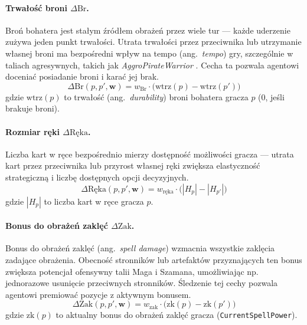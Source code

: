 \paragraph{Trwałość broni $\Delta \text{Br}$.}

Broń bohatera jest stałym źródłem obrażeń przez wiele tur --- każde uderzenie zużywa jeden punkt trwałości. Utrata trwałości przez przeciwnika lub utrzymanie własnej broni ma bezpośredni wpływ na tempo (ang.~\textit{tempo}) gry, szczególnie w taliach agresywnych, takich jak \textit{AggroPirateWarrior} \cite{sanchez2020}. Cecha ta pozwala agentowi doceniać posiadanie broni i karać jej brak.
\begin{equation}
    \Delta \text{Br}(p, p', \mathbf{w}) =
        w_{\text{Br}} \cdot \bigl(\text{wtrz}(p) - \text{wtrz}(p')\bigr)
\end{equation}
gdzie $\text{wtrz}(p)$ to trwałość (ang.~\textit{durability}) broni bohatera gracza $p$ (0, jeśli brakuje broni).

\paragraph{Rozmiar ręki $\Delta \text{Ręka}$.}

Liczba kart w ręce bezpośrednio mierzy dostępność możliwości gracza --- utrata kart przez przeciwnika lub przyrost własnej ręki zwiększa elastyczność strategiczną i liczbę dostępnych opcji decyzyjnych.
\begin{equation}
    \Delta \text{Ręka}(p, p', \mathbf{w}) =
        w_{\text{ręka}} \cdot \bigl(|H_p| - |H_{p'}|\bigr)
\end{equation}
gdzie $|H_p|$ to liczba kart w ręce gracza $p$.

\paragraph{Bonus do obrażeń zaklęć $\Delta \text{Zak}$.}

Bonus do obrażeń zaklęć (ang.~\textit{spell damage}) wzmacnia wszystkie zaklęcia zadające obrażenia. Obecność stronników lub artefaktów przyznających ten bonus zwiększa potencjał ofensywny talii Maga i Szamana, umożliwiając np. jednorazowe usunięcie przeciwnych stronników. Śledzenie tej cechy pozwala agentowi premiować pozycje z aktywnym bonusem.
\begin{equation}
    \Delta \text{Zak}(p, p', \mathbf{w}) =
        w_{\text{zak}} \cdot \bigl(\text{zk}(p) - \text{zk}(p')\bigr)
\end{equation}
gdzie $\text{zk}(p)$ to aktualny bonus do obrażeń zaklęć gracza (\texttt{CurrentSpellPower}).

